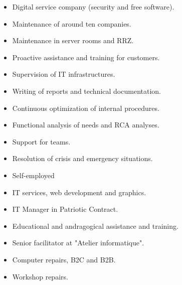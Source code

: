 \documentclass[10pt,a4paper,ragged2e,withhyper,normalphoto]{altacv}
\begin{document}
\begin{paracol}{2}

\begin{itemize}
\item Digital service company (security and free software).
\item Maintenance of around ten companies.
\item Maintenance in server rooms and RRZ.
\item Proactive assistance and training for customers.
\item Supervision of IT infrastructures.
\item Writing of reports and technical documentation.
\item Continuous optimization of internal procedures.
\item Functional analysis of needs and RCA analyses.
\item Support for teams.
\item Resolution of crisis and emergency situations.

\end{itemize}

\divider

\begin{itemize}
\item Self-employed
\item IT services, web development and graphics.
\end{itemize}

\divider

\begin{itemize}
\item IT Manager in Patriotic Contract.
\item Educational and andragogical assistance and training.
\end{itemize}

\switchcolumn

\begin{itemize}
\item Senior facilitator at "Atelier informatique".
\end{itemize}

\divider

\begin{itemize}
\item Computer repairs, B2C and B2B.
\item Workshop repairs.
\end{itemize}


\end{paracol}
\end{document}
